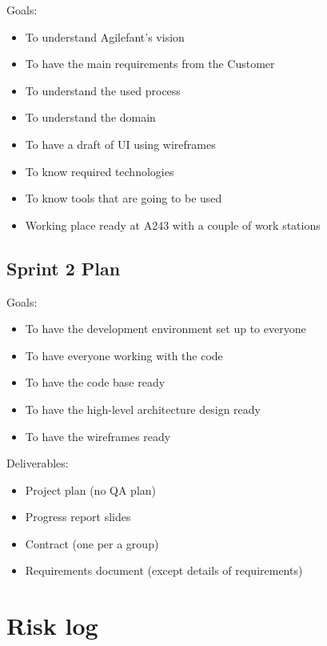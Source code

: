 Goals:
\begin{itemize}
\item To understand Agilefant's vision
\item To have the main requirements from the Customer
\item To understand the used process
\item To understand the domain
\item To have a draft of UI using wireframes
\item To know required technologies
\item To know tools that are going to be used
\item Working place ready at A243 with a couple of work stations
\end{itemize}

\subsection{Sprint 2 Plan}

Goals:
\begin{itemize}
\item To have the development environment set up to everyone
\item To have everyone working with the code 
\item To have the code base ready 
\item To have the high-level architecture design ready
\item To have the wireframes ready
\end{itemize}

\noindent Deliverables:
\begin{itemize}
\item Project plan (no QA plan)
\item Progress report slides
\item Contract (one per a group)
\item Requirements document (except details of requirements)
\end{itemize}

\section{Risk log}

